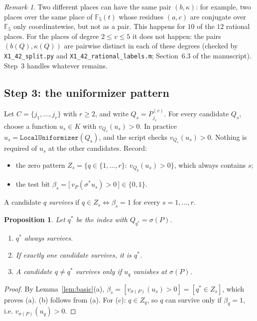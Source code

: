 \documentclass[11pt]{amsart}
\newtheorem{proposition}[theorem]{Proposition}
\theoremstyle{definition}
\theoremstyle{remark}
\newtheorem{remark}[theorem]{Remark}
\newcommand{\F}{\mathbb{F}}
\newcommand{\code}[1]{\texttt{#1}}
\begin{document}
\begin{remark}\label{rem:collisions}
Two different places can have the same pair $(b,\kappa)$: for example, two places over the same place of $\F_5(t)$ whose residues $(a,c)$ are conjugate over $\F_5$ only coordinatewise, but not as a pair. This happens for $10$ of the $12$ rational places. For the places of degree $2\le v\le5$ it does not happen: the pairs $(b(Q),\kappa(Q))$ are pairwise distinct in each of these degrees (checked by \code{X1\_42\_split.py} and \code{X1\_42\_rational\_labels.m}; Section~6.3 of the manuscript). Step~3 handles whatever remains.
\end{remark}

\subsection{Step 3: the uniformizer pattern}
Let $C=\{j_1,\dots,j_r\}$ with $r\ge2$, and write $Q_s=P^{(v)}_{j_s}$. For every candidate $Q_s$, choose a function $u_s\in K$ with $v_{Q_s}(u_s)>0$. In practice $u_s=\code{LocalUniformizer}(Q_s)$, and the script checks $v_{Q_s}(u_s)>0$. Nothing is required of $u_s$ at the other candidates. Record:
\begin{itemize}
\item the zero pattern $Z_s=\{q\in\{1,\dots,r\}:\ v_{Q_q}(u_s)>0\}$, which always contains $s$;
\item the test bit $\beta_s=\bigl[\,v_P(\sigma^*u_s)>0\,\bigr]\in\{0,1\}$.
\end{itemize}
A candidate $q$ \emph{survives} if $q\in Z_s\iff\beta_s=1$ for every $s=1,\dots,r$.

\begin{proposition}\label{prop:unif}
Let $q^\ast$ be the index with $Q_{q^\ast}=\sigma(P)$.
\begin{enumerate}[label=\textup{(\alph*)}]
\item $q^\ast$ always survives.
\item If exactly one candidate survives, it is $q^\ast$.
\item A candidate $q\neq q^\ast$ survives only if $u_q$ vanishes at $\sigma(P)$.
\end{enumerate}
\end{proposition}

\begin{proof}
By Lemma~\ref{lem:basic}(a), $\beta_s=[v_{\sigma(P)}(u_s)>0]=[q^\ast\in Z_s]$, which proves (a). (b) follows from (a). For (c): $q\in Z_q$, so $q$ can survive only if $\beta_q=1$, i.e. $v_{\sigma(P)}(u_q)>0$.
\end{proof}
\end{document}
